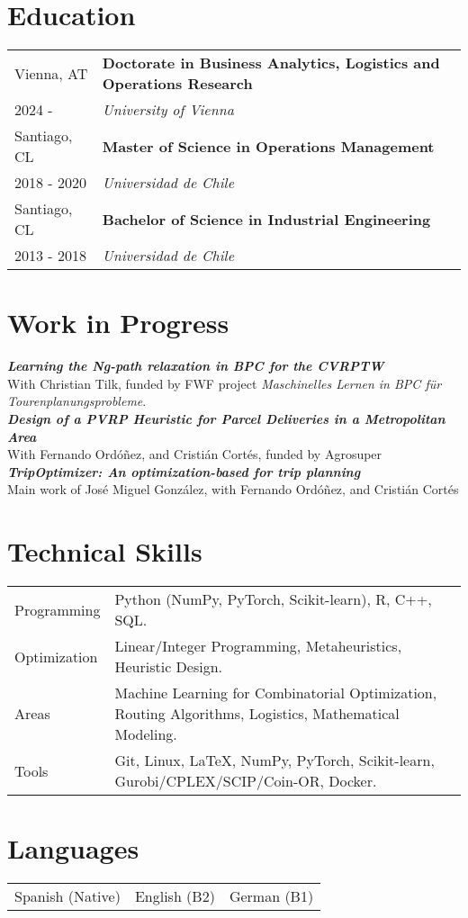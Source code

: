 \documentclass[10pt, a4paper]{article}
\begin{document}
\section*{Education}
\noindent
\begin{tabular}{@{} p{} p{} @{}}
    Vienna, AT & \textbf{Doctorate in Business Analytics, Logistics and Operations Research} \\
    2024 -  & \textit{University of Vienna} \\
    Santiago, CL & \textbf{Master of Science in Operations Management} \\
    2018 - 2020 & \textit{Universidad de Chile} \\
    Santiago, CL & \textbf{Bachelor of Science in Industrial Engineering} \\
    2013 - 2018 & \textit{Universidad de Chile} \\
\end{tabular}

\section*{Work in Progress}
\textbf{\textit{Learning the Ng-path relaxation in BPC for the CVRPTW}} \\
With Christian Tilk, funded by FWF project \textit{Maschinelles Lernen in BPC für Tourenplanungsprobleme}.\\
\textbf{\textit{Design of a PVRP Heuristic for Parcel Deliveries in a Metropolitan Area}} \\
With Fernando Ordóñez, and Cristián Cortés, funded by Agrosuper \\
\textbf{\textit{TripOptimizer: An optimization-based for trip planning}}\\
Main work of José Miguel González, with Fernando Ordóñez, and Cristián Cortés \\

\section*{Technical Skills}
\begin{tabular}{@{} p{} p{} @{}}
    Programming & Python (NumPy, PyTorch, Scikit-learn), R, C++, SQL. \\
    Optimization & Linear/Integer Programming, Metaheuristics, Heuristic Design.\\
    Areas & Machine Learning for Combinatorial Optimization, Routing Algorithms, Logistics, Mathematical Modeling.\\
    Tools & Git, Linux, \LaTeX, NumPy, PyTorch, Scikit-learn, Gurobi/CPLEX/SCIP/Coin-OR, Docker.\\
\end{tabular}

\section*{Languages}

\begin{tabular}{@{} p{} p{} p{} @{}}
    \centering
    Spanish (Native) & English (B2) & German (B1) \\
\end{tabular}
\end{document}
